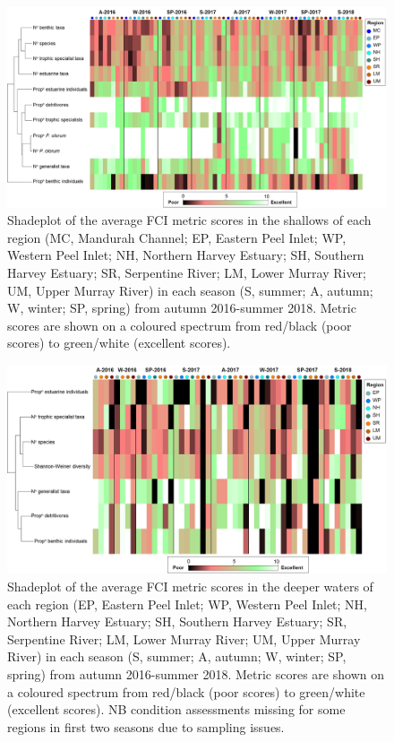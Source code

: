 \documentclass[
]{book}
\begin{document}
\begin{figure}
\includegraphics[width=1\linewidth]{images/fish_ecology/picture14} \caption{Shadeplot of the average FCI metric scores in the shallows of each region (MC, Mandurah Channel; EP, Eastern Peel Inlet; WP, Western Peel Inlet; NH, Northern Harvey Estuary; SH, Southern Harvey Estuary; SR, Serpentine River; LM, Lower Murray River; UM, Upper Murray River) in each season (S, summer; A, autumn; W, winter; SP, spring) from autumn 2016-summer 2018. Metric scores are shown on a coloured spectrum from red/black (poor scores) to green/white (excellent scores).}\label{fig:fish-ecology-pic14}
\end{figure}

\begin{figure}
\includegraphics[width=1\linewidth]{images/fish_ecology/picture15} \caption{Shadeplot of the average FCI metric scores in the deeper waters of each region (EP, Eastern Peel Inlet; WP, Western Peel Inlet; NH, Northern Harvey Estuary; SH, Southern Harvey Estuary; SR, Serpentine River; LM, Lower Murray River; UM, Upper Murray River) in each season (S, summer; A, autumn; W, winter; SP, spring) from autumn 2016-summer 2018. Metric scores are shown on a coloured spectrum from red/black (poor scores) to green/white (excellent scores). NB condition assessments missing for some regions in first two seasons due to sampling issues.}\label{fig:fish-ecology-pic15}
\end{figure}
\end{document}
